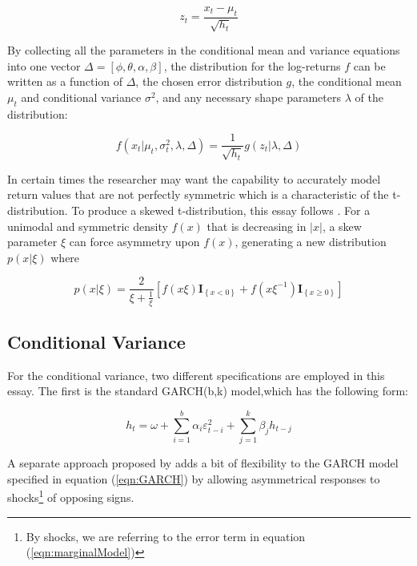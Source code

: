 \documentclass[12pt]{article}
\begin{document}
\begin{equation} \label{eq:z_score_returns}
    z_{t} = \frac{x_{t} - \mu_{t}}{\sqrt{h_{t}}}
\end{equation}

By collecting all the parameters in the conditional mean and variance equations into one vector $\Delta = [\phi, \theta, \alpha, \beta]$, the distribution for the log-returns $f$ can be written as a function of $\Delta$, the chosen error distribution $g$, the conditional mean $\mu_{t}$ and conditional variance $\sigma^{2}$, and any necessary shape parameters $\lambda$ of the distribution:

\begin{equation} \label{eq:conditional_distr}
    f(x_{t} | \mu_{t}, \sigma^{2}_{t}, \lambda, \Delta) = \frac{1}{\sqrt{h_{t}}} g(z_{t} | \lambda, \Delta)
\end{equation}

In certain times the researcher may want the capability to accurately model return values that are not perfectly symmetric which is a characteristic of the t-distribution. To produce a skewed t-distribution, this essay follows \cite{Fernandez_and_Steel_1998}. For a unimodal and symmetric density $f\left(x\right)$ that is decreasing in $\left\vert x\right\vert$, a skew parameter $\xi$ can force asymmetry upon $f\left(x\right)$, generating a new distribution $p\left(x|\xi\right)$ where

\begin{equation}
	p\left(x|\xi \right) = \frac{2}{\xi + \frac{1}{\xi}} \left[f\left(x\xi\right) \mathbf{I}_{\left\{x < 0\right\}} + f\left(x\xi^{-1}\right) \mathbf{I}_{\left\{x \geq 0\right\}}\right]
\end{equation}


\subsection{Conditional Variance}

For the conditional variance, two different specifications are employed in this essay. The first is the standard GARCH(b,k) model,which has the following form:

\begin{equation} \label{eqn:GARCH}
	h_{t} = \omega + \sum_{i = 1}^{b}\alpha_{i} \varepsilon_{t - i}^{2} + \sum_{j = 1}^{k}\beta_{j} h_{t - j}
\end{equation}

A separate approach proposed by \cite{GJR_1993} adds a bit of flexibility to the GARCH model specified in equation (\ref{eqn:GARCH}) by allowing asymmetrical responses to shocks\footnote{By shocks, we are referring to the error term in equation (\ref{eqn:marginalModel})} of opposing signs. 
\end{document}
